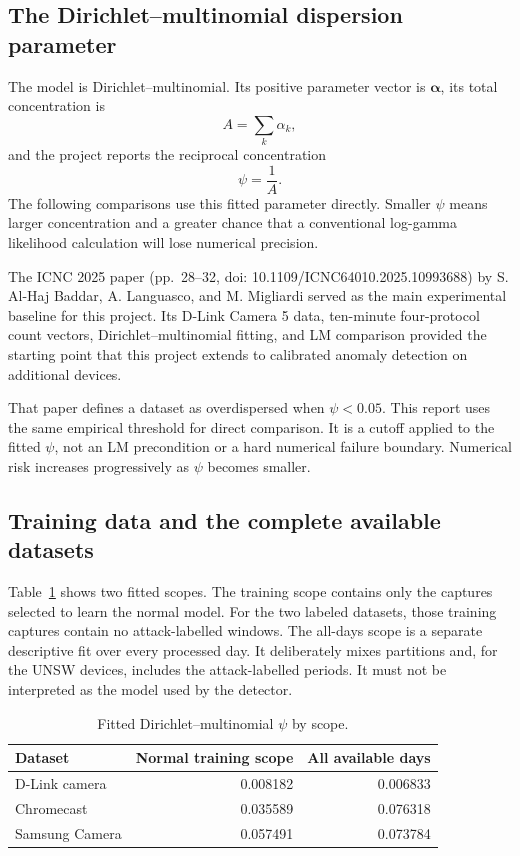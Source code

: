 \documentclass[11pt]{article}
\begin{document}
\subsection{The Dirichlet--multinomial dispersion parameter}

The model is Dirichlet--multinomial. Its positive parameter vector is
\(\boldsymbol{\alpha}\), its total concentration is
\[
  A=\sum_k\alpha_k,
\]
and the project reports the reciprocal concentration
\[
  \psi=\frac{1}{A}.
\]
The following comparisons use this fitted parameter directly. Smaller
\(\psi\) means larger concentration and a greater chance that a conventional
log-gamma likelihood calculation will lose numerical precision.

The ICNC 2025 paper (pp.~28--32, doi: 10.1109/ICNC64010.2025.10993688)
by S. Al-Haj Baddar, A. Languasco, and M. Migliardi served as the main
experimental baseline for this project. Its D-Link Camera 5 data, ten-minute
four-protocol count vectors, Dirichlet--multinomial fitting, and LM comparison
provided the starting point that this project extends to calibrated anomaly
detection on additional devices.

That paper defines a dataset as overdispersed when \(\psi<0.05\). This report
uses the same empirical threshold for direct comparison. It is a cutoff applied
to the fitted \(\psi\), not an LM precondition or a hard numerical failure
boundary. Numerical risk increases progressively as \(\psi\) becomes smaller.

\subsection{Training data and the complete available datasets}

Table~\ref{tab:aggregate-psi} shows two fitted scopes. The training
scope contains only the captures selected to learn the normal model. For the
two labeled datasets, those training captures contain no attack-labelled
windows. The all-days scope is a separate descriptive fit over every processed
day. It deliberately mixes partitions and, for the UNSW devices, includes the
attack-labelled periods. It must not be interpreted as the model used by the
detector.

\begin{table}[htbp]
\centering
\caption{Fitted Dirichlet--multinomial \(\psi\) by scope.}
\label{tab:aggregate-psi}
\begin{tabular}{lrr}
\toprule
Dataset & Normal training scope & All available days \\
\midrule
D-Link camera & 0.008182 & 0.006833 \\
Chromecast & 0.035589 & 0.076318 \\
Samsung Camera & 0.057491 & 0.073784 \\
\bottomrule
\end{tabular}
\end{table}
\end{document}

